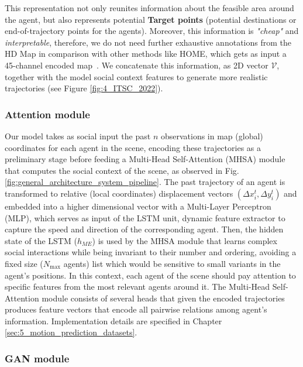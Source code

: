 This representation not only reunites information about the feasible area around the agent, but also represents potential \textbf{Target points} \cite{dendorfer2020goal} (\ie potential destinations or end-of-trajectory points for the agents). Moreover, this information is \textit{"cheap"} and \textit{interpretable}, therefore, we do not need further exhaustive annotations from the HD Map in comparison with other methods like HOME, which gets as input a 45-channel encoded map~\cite{gilles2021home}.
%
We concatenate this information, as 2D vector $\mathcal{V}$, together with the model social context features to generate more realistic trajectories (see Figure \ref{fig:4_ITSC_2022}).

\subsubsection{Attention module}

Our model takes as social input the past $n$ observations in map (global) coordinates for each agent in the scene, encoding these trajectories as a preliminary stage before feeding a Multi-Head Self-Attention (MHSA) \cite{vaswani2017attention} module that computes the social context of the scene, as observed in Fig. \ref{fig:general_architecture_system_pipeline}. The past trajectory of an agent is transformed to relative (local coordinates) displacement vectors $\left( \Delta x_i^t, \Delta y_i^t \right)$ and embedded into a higher dimensional vector with a Multi-Layer Perceptron (MLP), which serves as input of the LSTM unit, dynamic feature extractor to capture the speed and direction of the corresponding agent. Then, the hidden state of the LSTM ($h_{M\!E}$) is used by the MHSA module that learns complex social interactions while being invariant to their number and ordering, avoiding a fixed size ($N_{\text{max}}$ agents) list which would be sensitive to small variants in the agent's positions. In this context, each agent of the scene should pay attention to specific features from the most relevant agents around it. The Multi-Head Self-Attention module consists of several heads that given the encoded trajectories produces feature vectors that encode all pairwise relations among agent's information. Implementation details are specified in Chapter \ref{sec:5_motion_prediction_datasets}.

\subsubsection{GAN module}

